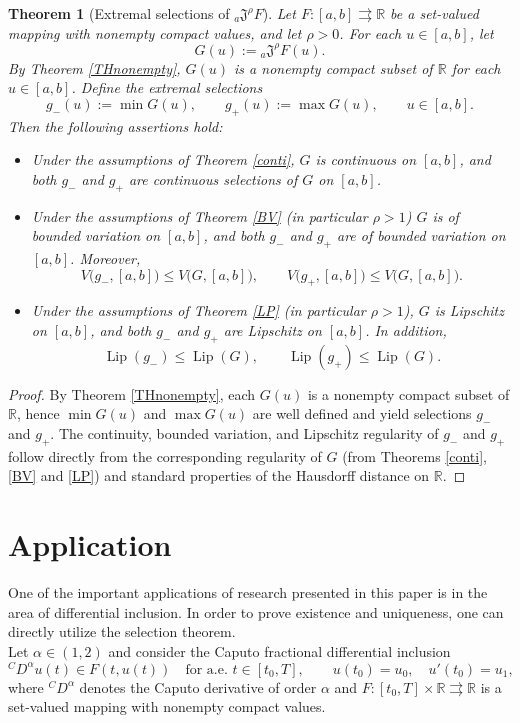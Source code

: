 \documentclass[a4paper,12pt,reqno]{amsart}
\numberwithin{equation}{section}
\newtheorem{theorem}{Theorem}[section]
\theoremstyle{definition}
\theoremstyle{remark}
\numberwithin{equation}{section}
\begin{document}
\begin{theorem}[Extremal selections of ${}_{a}\mathfrak{J}^{\rho}F$]

Let $F:[a,b]\rightrightarrows\mathbb{R}$ be a set-valued mapping with nonempty compact values, and let $\rho>0$. For each $u\in[a,b]$, let
$$G(u):={}_{a}\mathfrak{J}^{\rho}F(u).$$
By Theorem \ref{THnonempty}, $G(u)$ is a nonempty compact subset of $\mathbb{R}$ for each $u\in[a,b]$. Define the extremal selections
$$ g_{-}(u):=\min G(u),  \qquad g_{+}(u):=\max G(u), \qquad u\in[a,b]. $$
Then the following assertions hold:
\begin{itemize}
    \item[(a)] Under the assumptions of Theorem \ref{conti},  $G$ is continuous on $[a,b]$, and both $g_{-}$ and $g_{+}$ are continuous  selections of $G$ on $[a,b]$.
    
    \item[(b)] Under the assumptions of Theorem \ref{BV} (in particular $\rho>1$) 
$G$ is of bounded variation on $[a,b]$, and both $g_{-}$ and $g_{+}$ are of 
bounded variation on $[a,b]$. Moreover,
$$ V\big(g_{-},[a,b]\big)\le V\big(G,[a,b]\big), \qquad V\big(g_{+},[a,b]\big)\le V\big(G,[a,b]\big). $$
\item[(c)] Under the assumptions of Theorem \ref{LP} (in particular $\rho>1$), $G$ is 
Lipschitz on $[a,b]$, and both $g_{-}$ and $g_{+}$ are Lipschitz on $[a,b]$. 
In addition,
$$ \operatorname{Lip}(g_{-})\le \operatorname{Lip}(G), \qquad \operatorname{Lip}(g_{+})\le\operatorname{Lip}(G).
$$
\end{itemize}
\end{theorem}
    \begin{proof}
By Theorem \ref{THnonempty}, each $G(u)$ is a nonempty compact subset of $\mathbb{R}$, hence $\min G(u)$ and $\max G(u)$ are well defined and yield selections $g_{-}$ and $g_{+}$. The continuity, bounded variation, and Lipschitz regularity of $g_{-}$ and $g_{+}$ follow directly from the corresponding regularity of $G$ (from Theorems \ref{conti}, \ref{BV} and \ref{LP}) and standard properties of the Hausdorff distance on $\mathbb{R}$.
\end{proof}



\section*{\textbf{Application}}
One of the important applications of research presented in this paper is in the area of differential inclusion. In order to prove existence and uniqueness, one can directly utilize the selection theorem.   \\
 Let $\alpha\in(1,2)$ and consider the Caputo fractional
differential inclusion
\begin{equation}\label{CPEQN}
{}^{C}D^{\alpha}u(t)\in F(t,u(t))
\quad\text{for a.e. }t\in[t_{0},T],
\qquad
u(t_{0})=u_{0},\quad u'(t_{0})=u_{1},
\end{equation}
where ${}^{C}D^{\alpha}$ denotes the Caputo derivative of order $\alpha$ and
$F:[t_{0},T]\times\mathbb{R}\rightrightarrows\mathbb{R}$ is a set-valued
mapping with nonempty compact values.
\end{document}
